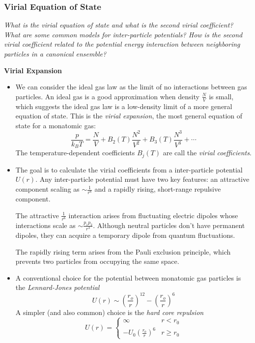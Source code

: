 \documentclass[11pt, a4paper]{article}
\begin{document}
\subsubsection{Virial Equation of State}
\textit{What is the virial equation of state and what is the second virial coefficient? What are some common models for inter-particle potentials? How is the second virial coefficient related to the potential energy interaction between neighboring particles in a canonical ensemble?}

\smallskip
\textbf{Virial Expansion}
\begin{itemize}
	\item We can consider the ideal gas law as the limit of no interactions between gas particles. An ideal gas is a good approximation when density $ \frac{N}{V} $ is small, which suggests the ideal gas law is a low-density limit of a more general equation of state. This is the \textit{virial expansion}, the most general equation of state for a monatomic gas:
	\begin{equation*}
		\frac{p}{k_{B}T} = \frac{N}{V} + B_{2}(T) \frac{N^{2}}{V^{2}} + B_{3}(T) \frac{N^{3}}{V^{3}} + \cdots
	\end{equation*}
	The temperature-dependent coefficients $ B_{j}(T) $ are call the \textit{virial coefficients}.
	
	\item The goal is to calculate the virial coefficients from a inter-particle potential $ U(r) $. Any inter-particle potential must have two key features: an attractive component scaling as $ \sim \frac{1}{r^{6}} $ and a rapidly rising, short-range repulsive component.
	
	The attractive $ \frac{1}{r^{6}} $ interaction arises from fluctuating electric dipoles whose interactions scale as $ \sim \frac{p_{1}p_{2}}{r^{3}} $. Although neutral particles don't have permanent dipoles, they can acquire a temporary dipole from quantum fluctuations. 
	
	The rapidly rising term arises from the Pauli exclusion principle, which prevents two particles from occupying the same space. 
	
	\item A conventional choice for the potential between monatomic gas particles is the \textit{Lennard-Jones potential}
	\begin{equation*}
		U(r) \sim \left(\frac{r_{o}}{r}\right)^{12} - \left(\frac{r_{o}}{r}\right)^{6}
	\end{equation*}
	A simpler (and also common) choice is the \textit{hard core repulsion}
	\begin{equation*}
		U(r) = 
		\begin{cases}
			\infty & r < r_{0}\\
			-U_{0}\left(\frac{r_{o}}{r}\right)^{6} & r \geq r_{0}
		\end{cases}
	\end{equation*}
\end{itemize}
\end{document}
